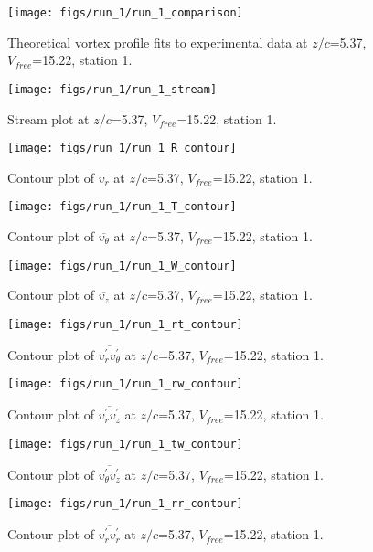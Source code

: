 \begin{figure}[H]
\centering
\texttt{[image: figs/run\_1/run\_1\_comparison]}
\caption{Theoretical vortex profile fits to experimental data at $z/c$=5.37, $V_{free}$=15.22, station 1.}
\end{figure}


\begin{figure}[H]
\centering
\texttt{[image: figs/run\_1/run\_1\_stream]}
\caption{Stream plot at $z/c$=5.37, $V_{free}$=15.22, station 1.}
\end{figure}


\begin{figure}[H]
\centering
\texttt{[image: figs/run\_1/run\_1\_R\_contour]}
\caption{Contour plot of $\overline{v_{r}}$ at $z/c$=5.37, $V_{free}$=15.22, station 1.}
\end{figure}


\begin{figure}[H]
\centering
\texttt{[image: figs/run\_1/run\_1\_T\_contour]}
\caption{Contour plot of $\overline{v_{\theta}}$ at $z/c$=5.37, $V_{free}$=15.22, station 1.}
\end{figure}


\begin{figure}[H]
\centering
\texttt{[image: figs/run\_1/run\_1\_W\_contour]}
\caption{Contour plot of $\overline{v_{z}}$ at $z/c$=5.37, $V_{free}$=15.22, station 1.}
\end{figure}


\begin{figure}[H]
\centering
\texttt{[image: figs/run\_1/run\_1\_rt\_contour]}
\caption{Contour plot of $\overline{v_{r}^{\prime} v_{\theta}^{\prime}}$ at $z/c$=5.37, $V_{free}$=15.22, station 1.}
\end{figure}


\begin{figure}[H]
\centering
\texttt{[image: figs/run\_1/run\_1\_rw\_contour]}
\caption{Contour plot of $\overline{v_{r}^{\prime} v_{z}^{\prime}}$ at $z/c$=5.37, $V_{free}$=15.22, station 1.}
\end{figure}


\begin{figure}[H]
\centering
\texttt{[image: figs/run\_1/run\_1\_tw\_contour]}
\caption{Contour plot of $\overline{v_{\theta}^{\prime} v_{z}^{\prime}}$ at $z/c$=5.37, $V_{free}$=15.22, station 1.}
\end{figure}


\begin{figure}[H]
\centering
\texttt{[image: figs/run\_1/run\_1\_rr\_contour]}
\caption{Contour plot of $\overline{v_{r}^{\prime} v_{r}^{\prime}}$ at $z/c$=5.37, $V_{free}$=15.22, station 1.}
\end{figure}


